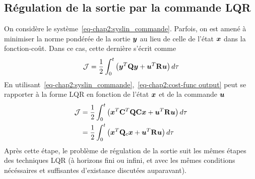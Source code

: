 \subsection{Régulation de la sortie par la commande LQR}
On considère le système~\eqref{eq-chap2:syslin_commande}. Parfois, on est amené à minimiser la norme pondérée de la sortie $\bm{y}$ au lieu de celle de l'état $\bm{x}$ dans la fonction-coût. Dans ce cas, cette dernière s'écrit comme 
\begin{equation}\label{eq-chap2:cost-func output}
		{\cal J} = \frac{1}{2}\int_{0}^{t}\left(\bm{y}^T\mathbf{Q}\bm{y} + \bm{u}^T\mathbf{R}\bm{u}\right) d\tau
\end{equation}
En utilisant~\eqref{eq-chap2:syslin_commande},~\eqref{eq-chap2:cost-func output} peut se rapporter à la forme LQR en fonction de l'état $\bm{x}$ et  de la commande $\bm{u}$ 
\begin{align}
	\begin{split}
		{\cal J} &=\frac{1}{2}\int_{0}^{t}\left(\bm{x}^T\mathbf{C}^T\mathbf{Q}\mathbf{C}\bm{x} + \bm{u}^T\mathbf{R}\bm{u}\right) d\tau\\
		&=\frac{1}{2}\int_{0}^{t}\left(\bm{x}^T\mathbf{Q}_{c}\bm{x} + \bm{u}^T\mathbf{R}\bm{u}\right)d\tau
	\end{split}	
\end{align}
Après cette étape, le problème de régulation de la sortie suit les mêmes étapes  des techniques LQR (à horizons fini ou infini, et avec les mêmes conditions nécéssaires et suffisantes d'existance discutées auparavant).  
